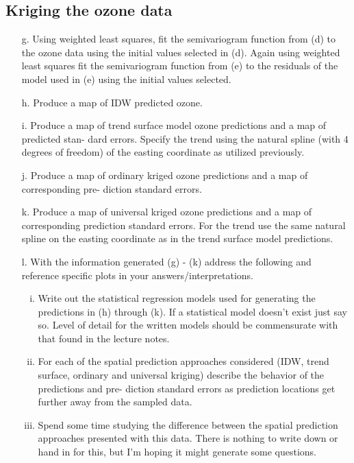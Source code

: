 \documentclass[letterpaper, 12pt]{article}
\begin{document}
\subsection*{Kriging the ozone data}
\begin{enumerate}
\item[g.]
Using weighted least squares, fit the semivariogram function from (d) to the ozone data using the initial values selected in (d). Again using weighted least squares fit the semivariogram function from (e) to the residuals of the model used in (e) using the initial values selected.
\item[h.]
Produce a map of IDW predicted ozone.
\item[i.]
Produce a map of trend surface model ozone predictions and a map of predicted stan- dard errors. Specify the trend using the natural spline (with 4 degrees of freedom) of the easting coordinate as utilized previously.
\item[j.]
Produce a map of ordinary kriged ozone predictions and a map of corresponding pre- diction standard errors.
\item[k.]
Produce a map of universal kriged ozone predictions and a map of corresponding prediction standard errors. For the trend use the same natural spline on the easting coordinate as in the trend surface model predictions.
\item[l.]
With the information generated (g) - (k) address the following and reference specific plots in your answers/interpretations.
\begin{enumerate}[(i)]
\item
Write out the statistical regression models used for generating the predictions in (h) through (k). If a statistical model doesn’t exist just say so. Level of detail for the written models should be commensurate with that found in the lecture notes.
\item
For each of the spatial prediction approaches considered (IDW, trend surface, ordinary and universal kriging) describe the behavior of the predictions and pre- diction standard errors as prediction locations get further away from the sampled data.
\item
Spend some time studying the difference between the spatial prediction approaches presented with this data. There is nothing to write down or hand in for this, but I’m hoping it might generate some questions.
\end{enumerate}
\end{enumerate}
\end{document}
